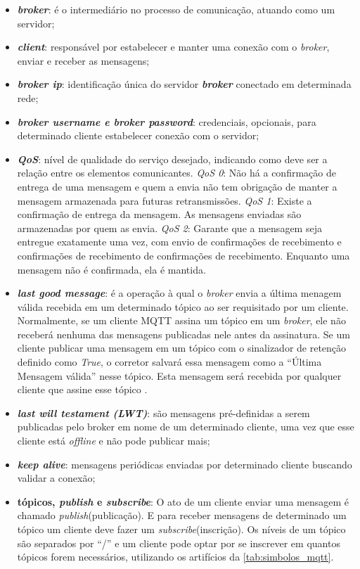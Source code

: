 \begin{itemize}
	\item \textbf{\textit{broker}}: é o intermediário no processo de comunicação, atuando como um servidor;
	\item \textbf{\textit{client}}: responsável por estabelecer e manter uma conexão com o \textit{broker}, enviar e receber as mensagens;
	\item \textit{\textbf{broker ip}}: identificação única do servidor \textit{\textbf{broker}} conectado em determinada rede;
	\item \textbf{\textit{broker username e broker password}}: credenciais, opcionais, para determinado cliente estabelecer conexão com o servidor; 
	\item  \textit{\textbf{QoS}}: nível de qualidade do serviço desejado, indicando como deve ser a relação entre os elementos comunicantes. \textit{QoS 0}: Não há a confirmação de entrega de uma mensagem e quem a envia não tem obrigação de manter a mensagem armazenada para futuras retransmissões. \textit{QoS 1}: Existe a confirmação de entrega da mensagem. As mensagens enviadas são armazenadas por quem as envia. \textit{QoS 2}: Garante que a mensagem seja entregue exatamente uma vez, com envio de confirmações de recebimento e confirmações de recebimento de confirmações de recebimento. Enquanto uma mensagem não é confirmada, ela é mantida.\cite{fabiobrandao}
	
	\item \textbf{\textit{last good message}}: é a operação à qual o \textit{broker} envia a última menagem válida recebida em um determinado tópico ao ser requisitado por um cliente. Normalmente, se um cliente MQTT assina um tópico em um \textit{broker}, ele não receberá nenhuma das mensagens publicadas nele antes da assinatura. Se um cliente publicar uma mensagem em um tópico com o sinalizador de retenção definido como \textit{True}, o corretor salvará essa mensagem como a “Última Mensagem válida” nesse tópico. Esta mensagem será recebida por qualquer cliente que assine esse tópico \cite{mntolia}. 
	
	\item \textbf{\textit{last will testament (LWT)}}: são mensagens pré-definidas a serem publicadas pelo broker em nome de um determinado cliente, uma vez que esse cliente está \textit{offline} e não pode publicar mais;
	\item \textbf{\textit{keep alive}}: mensagens periódicas enviadas por determinado cliente buscando validar a conexão;
	\item \textbf{tópicos, \textit{publish} e \textit{subscribe}}: O ato de um cliente enviar uma mensagem é chamado \textit{publish}(publicação). E para receber mensagens de determinado um tópico um cliente deve fazer um \textit{subscribe}(inscrição). Os níveis de um tópico são separados por “/” e um cliente pode optar por se inscrever em quantos tópicos forem necessários, utilizando os artifícios da \autoref{tab:simbolos_mqtt}.
	
\end{itemize}

